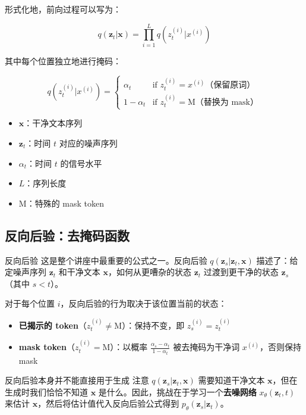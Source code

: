 形式化地，前向过程可以写为：

$$q(\mathbf{z}_t | \mathbf{x}) = \prod_{i=1}^{L} q(z_t^{(i)} | x^{(i)})$$

其中每个位置独立地进行掩码：

$$q(z_t^{(i)} | x^{(i)}) = \begin{cases} \alpha_t & \text{if } z_t^{(i)} = x^{(i)} \text{（保留原词）} \\ 1 - \alpha_t & \text{if } z_t^{(i)} = \text{M} \text{（替换为 mask）} \end{cases}$$

\begin{itemize}
    \item $\mathbf{x}$：干净文本序列
    \item $\mathbf{z}_t$：时间 $t$ 对应的噪声序列
    \item $\alpha_t$：时间 $t$ 的信号水平
    \item $L$：序列长度
    \item M：特殊的 mask token
\end{itemize}

\subsection{反向后验：去掩码函数}

\begin{importantbox}{反向后验}
这是整个讲座中最重要的公式之一。反向后验 $q(\mathbf{z}_s | \mathbf{z}_t, \mathbf{x})$ 描述了：给定噪声序列 $\mathbf{z}_t$ 和干净文本 $\mathbf{x}$，如何从更嘈杂的状态 $\mathbf{z}_t$ 过渡到更干净的状态 $\mathbf{z}_s$（其中 $s < t$）。
\end{importantbox}

对于每个位置 $i$，反向后验的行为取决于该位置当前的状态：
\begin{itemize}
    \item \textbf{已揭示的 token}（$z_t^{(i)} \neq \text{M}$）：保持不变，即 $z_s^{(i)} = z_t^{(i)}$
    \item \textbf{mask token}（$z_t^{(i)} = \text{M}$）：以概率 $\frac{\alpha_s - \alpha_t}{1 - \alpha_t}$ 被去掩码为干净词 $x^{(i)}$，否则保持 mask
\end{itemize}

\begin{warningbox}{反向后验本身并不能直接用于生成}
注意 $q(\mathbf{z}_s | \mathbf{z}_t, \mathbf{x})$ 需要知道干净文本 $\mathbf{x}$，但在生成时我们恰恰不知道 $\mathbf{x}$ 是什么。因此，挑战在于学习一个\textbf{去噪网络} $x_\theta(\mathbf{z}_t, t)$ 来估计 $\mathbf{x}$，然后将估计值代入反向后验公式得到 $p_\theta(\mathbf{z}_s | \mathbf{z}_t)$。
\end{warningbox}

